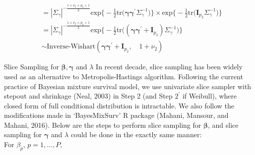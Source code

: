 \documentclass[a4paper, 12pt]{article}
\makeatletter
\renewcommand{\subsection}{\@startsection
	{subsection}    {2}    {0mm}    {-0.5\baselineskip}    {0.01\baselineskip}    {\normalfont\normalsize\itshape\center}}
\makeatother
\begin{document}
\begin{itemize}
\begin{equation*}
\begin{aligned}
		& = |\Sigma_{\gamma}|^{-\frac{1 + \nu_2 + p_2 +1}{2}}\mbox{exp}\Big\{-\frac{1}{2}\mbox{tr}\Big(\mathbf{\gamma}\mathbf{\gamma}^\prime \Sigma_{\gamma}^{-1}\Big)\Big\}\times \mbox{exp}\Big\{-\frac{1}{2}\mbox{tr}\Big(\mathbf{I}_{p_2}\Sigma_{\gamma}^{-1}\Big)\Big\}\\
		& = |\Sigma_{\gamma}|^{-\frac{1 + \nu_2 + p_2 +1}{2}}\mbox{exp}\Big\{-\frac{1}{2}\mbox{tr}\Big((\mathbf{\gamma}\mathbf{\gamma}^\prime + \mathbf{I}_{p_2})\Sigma_{\gamma}^{-1}\Big) \Big\}\\
		&\sim \mbox{Inverse-Wishart}(\mathbf{\gamma}\mathbf{\gamma}^\prime + \mathbf{I}_{p_2},\quad 1 + \nu_2)	
		\end{aligned}
		\end{equation*}
	\end{itemize} 
\subsection{Slice Sampling for $\mathbf{\beta}, \mathbf{\gamma}$ and $\lambda$}
\noindent In recent decade, slice sampling has been widely used as an alternative to Metropolis-Hastings algorithm. Following the current practice of Bayesian mixture survival model, we use univariate slice
sampler with stepout and shrinkage (Neal, 2003) in Step 2 (and Step $2^\prime$ if Weibull), where closed form of full conditional distribution is intractable. We also follow the modifications made in `BayesMixSurv' R package (Mahani, Mansour, and Mahani, 2016). Below are the steps to perform slice sampling for $\mathbf{\beta}$, and slice sampling for $\mathbf{\gamma}$ and $\lambda$ could be done in the exactly same manner:\\\newline
For ${\beta}_p$, $p=1,...,P,$
\end{document}
